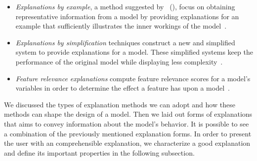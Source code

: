\begin{itemize}
    \item \emph{Explanations by example}, a method suggested by~\citeauthor{CaseBasedExplanation_Caruana} (\citeyear{CaseBasedExplanation_Caruana}), focus on obtaining representative information from a model by providing explanations for an example that sufficiently illustrates the inner workings of the model~\parencite{HowToExplainIndividualClassificationDecisions_Baehrens, XAIConceptsTaxonomies_Arrieta}.
    \item \emph{Explanations by simplification} techniques construct a new and simplified system to provide explanations for a model. These simplified systems keep the performance of the original model while displaying less complexity~\parencite{XAIConceptsTaxonomies_Arrieta}.
    \item \emph{Feature relevance explanations} compute feature relevance scores for a model's variables in order to determine the effect a feature has upon a model~\parencite{XAIConceptsTaxonomies_Arrieta}.
\end{itemize}
We discussed the types of explanation methods we can adopt and how these methods can shape the design of a model. Then we laid out forms of explanations that aims to convey information about the model's behavior. It is possible to see a combination of the previously mentioned explanation forms. In order to present the user with an comprehensible explanation, we characterize a good explanation and define its important properties in the following subsection.


